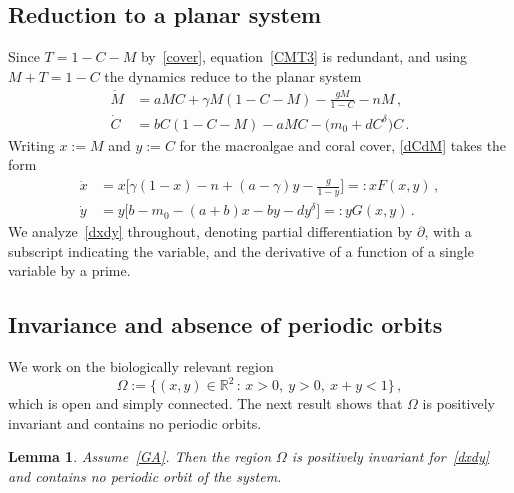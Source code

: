 \documentclass[reqno,11pt]{amsart}
\newtheorem{lem}[thm]{Lemma}
\numberwithin{equation}{section}
\newcommand{\R}{\mathbb{R}}
\begin{document}
\smallskip

\subsection{Reduction to a planar system}\label{subsec:reduction}

Since $T=1-C-M$ by~\eqref{cover}, equation~\eqref{CMT3} is redundant, and using $M+T=1-C$ the dynamics reduce to the planar system
\begin{subequations}\label{dCdM}
\begin{align}
\dot M &= a MC + \gamma M(1-C-M) - \frac{g M}{1-C} - n M\,, \\
\dot C &= b C(1-C-M) - a MC - \big(m_0 + d C^{\delta}\big)C\,.
\end{align}
\end{subequations}
Writing $x:=M$ and $y:=C$ for the macroalgae and coral cover, \eqref{dCdM} takes the form
\begin{subequations}\label{dxdy}
\begin{align}
\dot x &= x\Big[\gamma(1-x) - n + (a-\gamma)y - \frac{g}{1-y}\Big] =: xF(x,y)\,, \label{dxdy1}\\
\dot y &= y\Big[b - m_0 - (a+b)x - by - dy^{\delta}\Big] =: yG(x,y)\,. \label{dxdy2}
\end{align}
\end{subequations}
We analyze~\eqref{dxdy} throughout, denoting partial differentiation by $\partial$, with a subscript indicating the variable, and the derivative of a function of a single variable by a prime.

\smallskip

\subsection{Invariance and absence of periodic orbits}\label{subsec:invariance}

We work on the biologically relevant region
\begin{equation}\label{Omega}
\Omega:=\big\{(x,y)\in\R^2 \,:\, x>0,\ y>0,\ x+y<1\big\}\,,
\end{equation}
which is open and simply connected. The next result shows that $\Omega$ is positively invariant and contains no periodic orbits.

\begin{lem}\label{lem:dulac}
Assume~\eqref{GA}. Then the region $\Omega$ is positively invariant for~\eqref{dxdy} and contains no periodic orbit of the system.
\end{lem}
\end{document}
